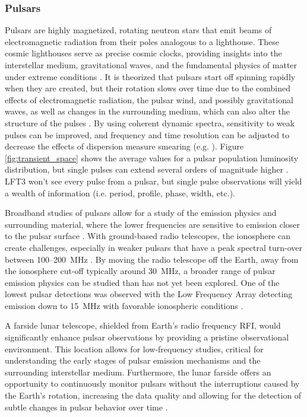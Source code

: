 \subsubsection{Pulsars}
Pulsars are highly magnetized, rotating neutron stars that emit beams of electromagnetic radiation from their poles analogous to a lighthouse. These cosmic lighthouses serve as precise cosmic clocks, providing insights into the interstellar medium, gravitational waves, and the fundamental physics of matter under extreme conditions \citep{pulsar_handbook, agazie_nanograv_2023}. It is theorized that pulsars start off spinning rapidly when they are created, but their rotation slows over time due to the combined effects of electromagnetic radiation, the pulsar wind, and possibly gravitational waves, as well as changes in the surrounding medium, which can also alter the structure of the pulses \citep{LW_2013}. By using coherent dynamic spectra, sensitivity to weak pulses can be improved, and frequency and time resolution can be adjusted to decrease the effects of dispersion measure smearing (e.g. \cite{WL_2020}). Figure \ref{fig:transient_space} shows the average values for a pulsar population luminosity distribution, but single pulses can extend several orders of magnitude higher \citep{karuppusamy_giant_2010}. LFT3 won't see every pulse from a pulsar, but single pulse observations will yield a wealth of information (i.e. period, profile, phase, width, etc.). 


Broadband studies of pulsars allow for a study of the emission physics and surrounding material, where the lower frequencies are sensitive to emission closer to the pulsar surface \citep{hassall_wide-band_2012}. With ground-based radio telescopes, the ionosphere can create challenges, especially in weaker pulsars that have a peak spectral turn-over between 100--200~MHz \citep{Stappers_2011}. By moving the radio telescope off the Earth, away from the ionosphere cut-off typically around 30~MHz, a broader range of pulsar emission physics can be studied than has not yet been explored. One of the lowest pulsar detections was observed with the Low Frequency Array detecting emission down to 15~MHz with favorable ionospheric conditions \citep{Kondratiev_2012}.


A farside lunar telescope, shielded from Earth’s radio frequency RFI, would significantly enhance pulsar observations by providing a pristine observational environment. This location allows for low-frequency studies, critical for understanding the early stages of pulsar emission mechanisms and the surrounding interstellar medium. Furthermore, the lunar farside offers an opportunity to continuously monitor pulsars without the interruptions caused by the Earth’s rotation, increasing the data quality and allowing for the detection of subtle changes in pulsar behavior over time \citep{jankowski_spectral_2018}.


